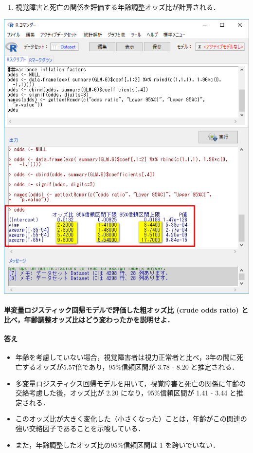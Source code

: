 \documentclass[]{problemset}
\providecommand{\tightlist}{%
  \setlength{\itemsep}{0pt}\setlength{\parskip}{0pt}}
\let\oldparagraph\paragraph
\renewcommand{\paragraph}[1]{\oldparagraph{#1}\mbox{}}
\begin{document}
\begin{enumerate}
\def\labelenumi{\arabic{enumi}.}
\setcounter{enumi}{3}
\tightlist
\item
  視覚障害と死亡の関係を評価する年齢調整オッズ比が計算される．
\end{enumerate}

\begin{center}\includegraphics[width=0.5\linewidth,height=0.5\textheight]{pic/mltlogstic07} \end{center}

\hypertarget{-crude-odds-ratio-}{%
\paragraph{単変量ロジスティック回帰モデルで評価した粗オッズ比 (crude
odds ratio)
と比べ，年齢調整オッズ比はどう変わったかを説明せよ．}\label{-crude-odds-ratio-}}

\hypertarget{-7}{%
\paragraph{答え}\label{-7}}

\begin{itemize}
\item
  年齢を考慮していない場合，視覚障害者は視力正常者と比べ，3年の間に死亡するオッズが5.57倍であり，95\%信頼区間が
  3.78 - 8.20 と推定される．
\item
  多変量ロジスティクス回帰モデルを用いて，視覚障害と死亡の関係に年齢の交絡考慮した後，オッズ比が
  2.20 になり，95\%信頼区間が 1.41 - 3.44 と推定される．
\item
  このオッズ比が大きく変化した（小さくなった）ことは，年齢がこの関連の強い交絡因子であることを示唆している．
\item
  また，年齢調整したオッズ比の95\%信頼区間は 1 を跨いでいない．
\end{itemize}
\end{document}
